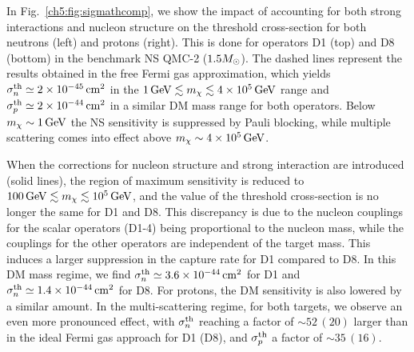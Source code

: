 In Fig.~\ref{ch5:fig:sigmathcomp}, we show the impact of accounting for both strong interactions and nucleon structure on the threshold cross-section for both neutrons (left) and protons (right). This is done for operators D1 (top) and D8 (bottom) in the benchmark NS QMC-2 ($1.5M_\odot$). The dashed lines represent the results obtained in the free Fermi gas approximation, which yields $\sigma^\mathrm{th}_n\simeq2\times10^{-45}{\rm \,cm}^2$ in the $1{\rm \,GeV}\lesssim m_\chi\lesssim 4\times 10^5{\rm \,GeV}$ range and $\sigma^\mathrm{th}_p\simeq2\times10^{-44}{\rm \,cm}^2$ in a similar DM mass range for both operators. Below $m_\chi\sim1{\rm \,GeV}$ the NS sensitivity is suppressed by Pauli blocking, while multiple scattering comes into effect above $m_\chi\sim4\times10^5{\rm \,GeV}$. 

When the corrections for nucleon structure and strong interaction are introduced (solid lines), the region of maximum sensitivity is reduced to $100{\rm \,GeV}\lesssim m_\chi\lesssim  10^5{\rm \,GeV}$, and the value of the threshold cross-section is no longer the same for D1 and D8. This discrepancy is due to the nucleon couplings for the scalar operators (D1-4) being proportional to the nucleon mass, while the couplings for the other operators are independent of the target mass. This induces a larger suppression in the capture rate for D1 compared to D8. In this DM mass regime, we find $\sigma^\mathrm{th}_n\simeq3.6\times10^{-44}{\rm \,cm}^2$ for D1 and $\sigma^\mathrm{th}_n\simeq1.4\times10^{-44}{\rm \,cm}^2$  for D8. For protons, the DM sensitivity is also lowered by a similar amount. In the multi-scattering regime, for both targets, we observe an even more pronounced effect, with $\sigma^\mathrm{th}_n$ reaching a factor of $\sim52 \,(20)$ larger than in the ideal Fermi gas approach for D1 (D8), and $\sigma^\mathrm{th}_p$  a factor of $\sim 35 \,(16)$. 

